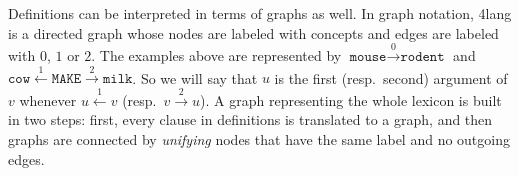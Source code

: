 \documentclass[a4paper,10pt]{article}
\begin{document}
Definitions can be interpreted in terms of graphs as well. In graph notation, 4lang is a directed graph whose nodes are labeled with concepts and edges are labeled with $0$, $1$ or $2$. The examples above are represented by $\texttt{mouse}\xrightarrow{0}\texttt{rodent}$ and $\texttt{cow}\xleftarrow{1}\texttt{MAKE}\xrightarrow{2}\texttt{milk}$. So we will say that $u$ is the first (resp.\ second) argument of $v$ whenever $u\xleftarrow{1}v$ (resp.\ $v\xrightarrow 2 u$).
A graph representing the whole lexicon is built in two steps: first, every clause in definitions is translated to a graph, and then graphs are connected by \emph{unifying} nodes that have the same label and no outgoing edges.

\end{document}
